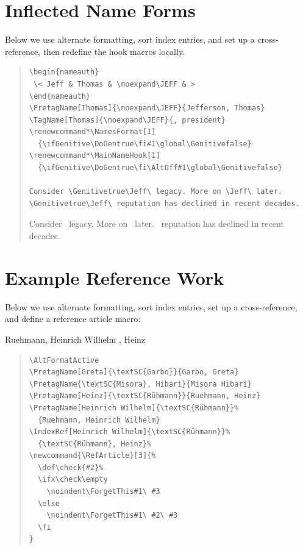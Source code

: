\documentclass[oneside]{article}
\makeatletter
\newcounter{VerbLine}
\newif\ifGenitive
\newif\ifDoGen
\newcommand\JEFF{\ifDoGen\textSC{Jefferson's}\else\textSC{Jefferson}\fi}
\newcommand*\StartNum{\setcounter{VerbLine}{0}\def\verbatim@processline{\stepcounter{VerbLine}\leavevmode\llap{\footnotesize\normalfont\theVerbLine\quad}\the\verbatim@line\par}}
\makeatother
\begin{document}
\section{Inflected Name Forms}

\begingroup
Below we use alternate formatting, sort index entries, and set up a cross-reference, then redefine the hook macros locally.
\AltFormatActive
 \renewcommand*\NamesFormat[1]{\ifGenitive\DoGentrue\fi#1\global\Genitivefalse}
 \renewcommand*\MainNameHook[1]{\ifGenitive\DoGentrue\fi\AltOff#1\global\Genitivefalse}
 \begin{quote}\small
 \StartNum
 \begin{verbatim}
\begin{nameauth}
 \< Jeff & Thomas & \noexpand\JEFF & >
\end{nameauth}
\PretagName[Thomas]{\noexpand\JEFF}{Jefferson, Thomas}
\TagName[Thomas]{\noexpand\JEFF}{, president}
\renewcommand*\NamesFormat[1]
  {\ifGenitive\DoGentrue\fi#1\global\Genitivefalse}
\renewcommand*\MainNameHook[1]
  {\ifGenitive\DoGentrue\fi\AltOff#1\global\Genitivefalse}

Consider \Genitivetrue\Jeff\ legacy. More on \Jeff\ later.
\Genitivetrue\Jeff\ reputation has declined in recent decades.
\end{verbatim}

 \smallskip
 Consider \Genitivetrue\Jeff\ legacy. More on \Jeff\ later.
 \Genitivetrue\Jeff\ reputation has declined in recent decades.
 \end{quote}
\AltFormatInactive
\endgroup
\newpage

\section{Example Reference Work}

Below we use alternate formatting, sort index entries, set up a cross-reference, and define a reference article macro:

\AltFormatActive
{}
%
  {Ruehmann, Heinrich Wilhelm}
%
  {, Heinz}%
\newcommand{\RefArticle}[3]{%
  \def\check{#2}%
  \ifx\check\empty
    \noindent\ForgetThis#1\ #3
  \else
    \noindent\ForgetThis#1\ #2\ #3
  \fi
}
\begin{quote}\small
\StartNum
\begin{verbatim}
\AltFormatActive
\PretagName[Greta]{\textSC{Garbo}}{Garbo, Greta}
\PretagName{\textSC{Misora}, Hibari}{Misora Hibari}
\PretagName[Heinz]{\textSC{Rühmann}}{Ruehmann, Heinz}
\PretagName[Heinrich Wilhelm]{\textSC{Rühmann}}%
  {Ruehmann, Heinrich Wilhelm}
\IndexRef[Heinrich Wilhelm]{\textSC{Rühmann}}%
  {\textSC{Rühmann}, Heinz}%
\newcommand{\RefArticle}[3]{%
  \def\check{#2}%
  \ifx\check\empty
    \noindent\ForgetThis#1\ #3
  \else
    \noindent\ForgetThis#1\ #2\ #3
  \fi
}
\end{verbatim}
\end{quote}
\end{document}
